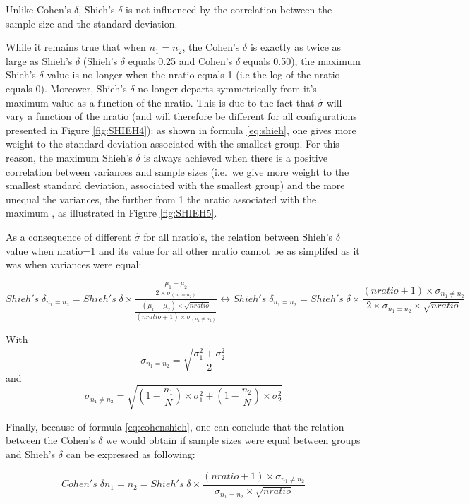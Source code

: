 \documentclass[
  man]{apa6}
\begin{document}
Unlike Cohen's \(\delta\), Shieh's \(\delta\) is not influenced by the correlation between the sample size and the standard deviation.

While it remains true that when \(n_{1}=n_{2}\), the Cohen's \(\delta\) is exactly as twice as large as Shieh's \(\delta\) (Shieh's \(\delta\) equals 0.25 and Cohen's \(\delta\) equals 0.50), the maximum Shieh's \(\delta\) value is no longer when the nratio equals 1 (i.e the log of the nratio equals 0). Moreover, Shieh's \(\delta\) no longer departs symmetrically from it's maximum value as a function of the nratio. This is due to the fact that \(\hat{\sigma}\) will vary a function of the nratio (and will therefore be different for all configurations presented in Figure \ref{fig:SHIEH4}): as shown in formula \ref{eq:shieh}, one gives more weight to the standard deviation associated with the smallest group. For this reason, the maximum Shieh's \(\delta\) is always achieved when there is a positive correlation between variances and sample sizes (i.e.~we give more weight to the smallest standard deviation, associated with the smallest group) and the more unequal the variances, the further from 1 the nratio associated with the maximum , as illustrated in Figure \ref{fig:SHIEH5}.

As a consequence of different \(\hat{\sigma}\) for all nratio's, the relation between Shieh's \(\delta\) value when nratio=1 and its value for all other nratio cannot be as simplifed as it was when variances were equal:

\begin{equation} 
Shieh's \; \delta_{n_1=n_2}= Shieh's \; \delta \times \frac{\frac{\mu_1-\mu_2}{2 \times \sigma_{(n_1=n_2)}}}{\frac{(\mu_1-\mu_2) \times \sqrt{nratio}}{(nratio+1) \times \sigma_{(n_1\neq n_2)}}}
\leftrightarrow Shieh's \; \delta_{n_1=n_2}= Shieh's \; \delta \times \frac{(nratio+1) \times \sigma_{n_1 \neq n_2}}{2 \times \sigma_{n_1=n_2} \times \sqrt{nratio}}
\label{eq:shiehvsbaldesign}
\end{equation}

With \[\sigma_{n_1=n_2}= \sqrt{\frac{\sigma_1^2+\sigma_2^2}{2}}\] and
\[\sigma_{n_1 \neq n_2} = \sqrt{(1- \frac{n_1}{N}) \times \sigma_1^2+(1- \frac{n_2}{N}) \times \sigma_2^2}\]

Finally, because of formula \ref{eq:cohenshieh}, one can conclude that the relation between the Cohen's \(\delta\) we would obtain if sample sizes were equal between groups and Shieh's \(\delta\) can be expressed as following:

\begin{equation} 
Cohen's \; \delta{n_1=n_2}= Shieh's \; \delta \times \frac{(nratio+1) \times \sigma_{n_1 \neq n_2}}{\sigma_{n_1=n_2} \times \sqrt{nratio}}
\label{eq:shiehvsbaldesign2}
\end{equation}
\end{document}
